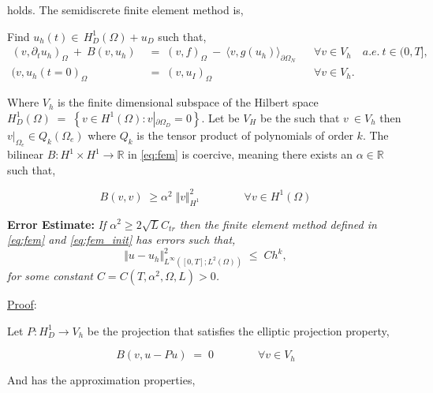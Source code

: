 \documentclass[10pt]{report}
\numberwithin{equation}{section}
\begin{document}
\noindent
holds.  The semidiscrete finite element method is, \newline

Find $u_{h}(t) \in \, H^{1}_{D}(\Omega) + u_{D}$ such that,
\begin{align}
(v,\partial_{t} u_{h})_{\Omega} \ + \ B(v,u_{h}) \; &= \; (v,f)_{\Omega} \ - \ \langle v, g(u_{h}) \rangle_{\partial \Omega_{N}} && \forall v \in V_{h} \quad   a.e. \ t \in (0,T], \label{eq:fem} \\
(v,u_{h}(t=0)_{\Omega} \; &= \; (v,u_{I})_{\Omega} && \forall v \in V_{h} \label{eq:fem_init}.
\end{align}


Where $V_{h}$ is the finite dimensional subspace of the Hilbert space $H_{D}^{1}(\Omega) \; = \; \left\{ v \in H^{1}(\Omega) : v \left\vert_{\partial \Omega_{D}} \right.  =  0 \right\}$.  Let be $V_{H}$ be the such that $v \ \in V_{h}$ then $v \vert_{\Omega_{e}} \in Q_{k}(\Omega_{e})$ where $Q_{k}$ is the tensor product of polynomials of order $k$. The bilinear $B : H^{1} \times H^{1} \rightarrow \mathbb{R}$ in \eqref{eq:fem} is coercive, meaning there exists an $\alpha \in \mathbb{R}$ such that,


\begin{equation}
B(v,v) \; \geq \alpha^{2} \; \Vert v \Vert_{H^{1}}^{2} \qquad \qquad \forall v \in H^{1}(\Omega)
\end{equation}

\bigskip


\textbf{Error Estimate:}
\textit{
If $\alpha^{2} \geq 2 \sqrt{L} C_{tr}$ then the finite element method defined in \eqref{eq:fem} and \eqref{eq:fem_init} has errors such that,}
\begin{equation}
\Vert u - u_{h} \Vert^{2}_{L^{\infty}\left([0,T]; L^{2}(\Omega)\right)}  \; \leq \; Ch^{k},
\end{equation}
\textit{for some constant $C = C(T,\alpha^{2},\Omega,L) > 0$.}

\medskip


\underline{Proof}:



Let $P: H^{1}_{D} \rightarrow V_{h}$ be the projection that satisfies the elliptic projection property,

\begin{equation}
B(v,u - Pu) \; = \; 0 \qquad \qquad \forall v \in V_{h}
\end{equation}


And has the approximation properties,
\end{document}
